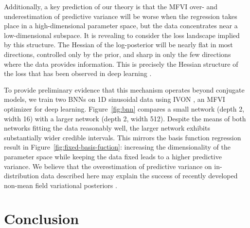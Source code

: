 \documentclass{article}
\theoremstyle{plain}
\theoremstyle{definition}
\theoremstyle{remark}
\theoremstyle{plain}
\begin{document}
Additionally, a key prediction of our theory is that the MFVI over- and underestimation of predictive variance will be worse when the regression takes place in a high-dimensional parameter space, but the data concentrates near a low-dimensional subspace. 
It is revealing to consider the loss landscape implied by this structure. The Hessian of the log-posterior will be nearly flat in most directions, controlled only by the prior, and sharp in only the few directions where the data provides information. This is precisely the Hessian structure of the loss that has been observed in deep learning \cite{sagun2016eigenvalues}. 

To provide preliminary evidence that this mechanism operates beyond conjugate models, we train two BNNs on 1D sinusoidal data using IVON \cite{shen2024variational}, an MFVI optimizer for deep learning. Figure~\ref{fig:bnn} compares a small network (depth 2, width 16) with a larger network (depth 2, width 512). 
Despite the means of both networks fitting the data reasonably well, the larger network exhibits substantially wider credible intervals. This mirrors the basis function regression result in Figure~\ref{fig:fixed-basis-fuction}: increasing the dimensionality of the parameter space while keeping the data fixed leads to a higher predictive variance. We believe that the overestimation of predictive variance on in-distribution data described here may explain the success of recently developed non-mean field variational posteriors \citep{fadel2025viking}. 

\section{Conclusion}

\end{document}
